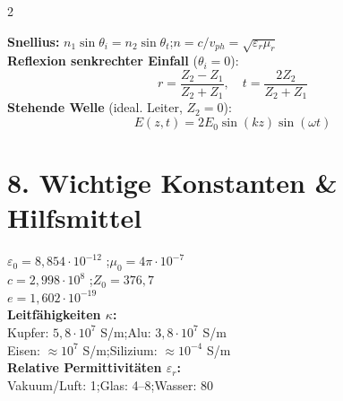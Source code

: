 \documentclass[a4paper, 7.5pt]{extarticle}
\begin{document}
\begin{multicols*}{2}
\begin{tcolorbox}[title={Reflexion \& Brechung an Grenzflächen}]
\begin{center}
\end{center}
\textbf{Snellius:} $n_1\sin\theta_i = n_2\sin\theta_t$;\quad $n=c/v_{ph}=\sqrt{\varepsilon_r\mu_r}$\\[3pt]
\textbf{Reflexion senkrechter Einfall} ($\theta_i=0$):
$$r = \frac{Z_2-Z_1}{Z_2+Z_1},\quad t = \frac{2Z_2}{Z_2+Z_1}$$
\textbf{Stehende Welle} (ideal. Leiter, $Z_2=0$):
$$E(z,t) = 2E_0\sin(kz)\sin(\omega t)$$
\end{tcolorbox}

\section*{8. Wichtige Konstanten \& Hilfsmittel}

\begin{tcolorbox}[title={Konstanten \& Materialdaten}]
$\varepsilon_0 = 8{,}854\cdot10^{-12}$ \;\text{\textcolor{boxtitle}{[\(F/m\)]}};\quad $\mu_0 = 4\pi\cdot10^{-7}$ \;\text{\textcolor{boxtitle}{[\(H/m\)]}}\\
$c = 2{,}998\cdot10^8$ \;\text{\textcolor{boxtitle}{[\(m/s\)]}};\quad $Z_0 = 376{,}7$ \;\text{\textcolor{boxtitle}{[\(\Omega\)]}}\\
$e = 1{,}602\cdot10^{-19}$ \;\text{\textcolor{boxtitle}{[\(C\)]}}\\[3pt]
\textbf{Leitfähigkeiten $\kappa$:}\\
Kupfer: $5{,}8\cdot10^7$ S/m;\quad Alu: $3{,}8\cdot10^7$ S/m\\
Eisen: $\approx10^7$ S/m;\quad Silizium: $\approx10^{-4}$ S/m\\[3pt]
\textbf{Relative Permittivitäten $\varepsilon_r$:}\\
Vakuum/Luft: 1;\quad Glas: 4--8;\quad Wasser: 80
\end{tcolorbox}


\end{multicols*}
\end{document}
